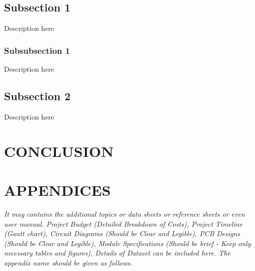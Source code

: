 \documentclass{ioereport}
\begin{document}
    \subsection{Subsection 1}
        Description here
        \subsubsection{Subsubsection 1}
            Description here
    \subsection{Subsection 2}
        Description here

    \pagebreak

\section{\MakeUppercase{Conclusion}}
    \lipsum[2]

    \pagebreak
    
\section{\MakeUppercase{Appendices}} \label{sec:appendices}
    \textit{It may contains the additional topics or data sheets or reference sheets or even user manual. Project Budget (Detailed Breakdown of Costs), Project Timeline (Gantt chart), Circuit Diagrams (Should be Clear and Legible), PCB Designs (Should be Clear and Legible), Module Specifications (Should be brief - Keep only necessary tables and figures), Details of Dataset can be included here. The appendix name should be given as follows.}
    
\end{document}
